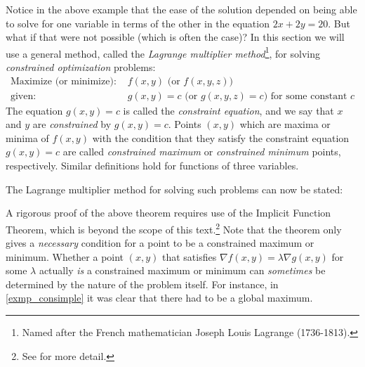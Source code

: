 Notice in the above example that the ease of the solution depended on being able to solve for one variable in terms of the other in the equation $2x+2y=20$. But what if that were not possible (which is often the case)? In this section we will use a general method, called the \emph{Lagrange multiplier method}\footnote{Named after the French mathematician Joseph Louis Lagrange (1736-1813).}, for solving \emph{constrained optimization} problems:
\begin{align*}
 \text{Maximize (or minimize): }& f(x,y) \text{ (or $f(x,y,z)$)}\\
 \text{given: }& g(x,y) = c \text{ (or $g(x,y,z) = c$) for some constant $c$}
\end{align*}
The equation $g(x,y) = c$ is called the \emph{constraint equation}, and we say that $x$ and $y$ are \emph{constrained} by $g(x,y) = c$. Points $(x,y)$ which are maxima or minima of $f(x,y)$ with the condition that they satisfy the constraint equation $g(x,y)=c$ are called \emph{constrained maximum} or \emph{constrained minimum} points, respectively. Similar definitions hold for functions of three variables.

The Lagrange multiplier method for solving such problems can now be stated:


A rigorous proof of the above theorem requires use of the Implicit Function Theorem, which is beyond the scope of this text.\footnote{See \cite[\S\,6.8]{tm} for more detail.} Note that the theorem only gives a \emph{necessary} condition for a point to be a constrained maximum or minimum. Whether a point $(x,y)$ that satisfies $\nabla f(x,y) = \lambda \nabla g(x,y)$ for some $\lambda$ actually \emph{is} a constrained maximum or minimum can \emph{sometimes} be determined by the nature of the problem itself. For instance, in \autoref{exmp_consimple} it was clear that there had to be a global maximum.


